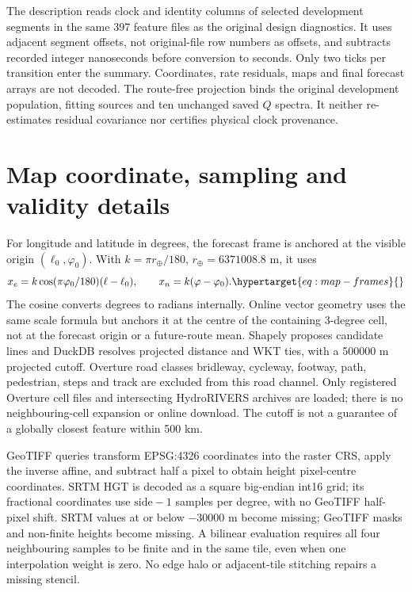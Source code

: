The description reads clock and identity columns of selected development
segments in the same 397 feature files as the original design diagnostics.
It uses adjacent segment offsets, not original-file row numbers as offsets,
and subtracts recorded integer nanoseconds before conversion to seconds.
Only two ticks per transition enter the summary. Coordinates, rate residuals,
maps and final forecast arrays are not decoded. The route-free projection
 binds the original
development population, fitting sources and ten unchanged saved $Q$ spectra.
It neither re-estimates residual covariance nor certifies physical clock provenance.


\section{Map coordinate, sampling and validity details}
\label{sec:map-query-details}\hypertarget{sec:map-query-details}{}
For longitude and latitude in degrees, the forecast frame is anchored at
the visible origin \((\ell_0,\varphi_0)\). With
\(k=\pi r_\oplus/180\), \(r_\oplus=6371008.8\) m, it uses
\begin{equation}
 x_e=k\cos(\pi\varphi_0/180)(\ell-\ell_0),\qquad
 x_n=k(\varphi-\varphi_0).
 \label{eq:map-frames}\hypertarget{eq:map-frames}{}
\end{equation}
The cosine converts degrees to radians internally. Online vector geometry
uses the same scale formula but anchors it at the centre of the containing
3-degree cell, not at the forecast origin or a future-route mean. Shapely
proposes candidate lines and DuckDB resolves projected distance and WKT ties,
with a 500000 m projected cutoff. Overture road classes bridleway, cycleway,
footway, path, pedestrian, steps and track are excluded from this road channel.
Only registered Overture cell files and intersecting HydroRIVERS archives
are loaded; there is no neighbouring-cell expansion or online download.
The cutoff is not a guarantee of a globally closest feature within 500 km.

GeoTIFF queries transform EPSG:4326 coordinates into the raster CRS, apply
the inverse affine, and subtract half a pixel to obtain height pixel-centre
coordinates. SRTM HGT is decoded as a square big-endian int16 grid; its
fractional coordinates use \(\mathrm{side}-1\) samples per degree, with no
GeoTIFF half-pixel shift. SRTM values at or below \(-30000\) m become missing;
GeoTIFF masks and non-finite heights become missing. A bilinear evaluation
requires all four neighbouring samples to be finite and in the same tile,
even when one interpolation weight is zero. No edge halo or adjacent-tile
stitching repairs a missing stencil.

